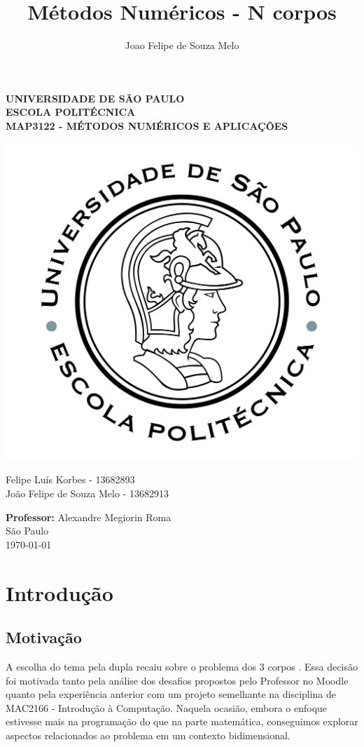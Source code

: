 \documentclass[a4paper, 12pt]{article} %
\title{Métodos Numéricos - N corpos}
\author{Joao  Felipe de Souza Melo}
\begin{document}
\begin{titlepage}
    \centering

    \textbf{\large UNIVERSIDADE DE SÃO PAULO \\
        ESCOLA POLITÉCNICA \\
        MAP3122 - MÉTODOS NUMÉRICOS E APLICAÇÕES}
    \vspace{1.0cm} 
    
    \includegraphics[width=1\textwidth]{poli.jpg}  
    
    \vspace{1cm}  

    Felipe Luís Korbes - 13682893 \\
    João Felipe de Souza Melo - 13682913 \\
    
    \vspace{0.5cm}
    
    \textbf{Professor:} Alexandre Megiorin Roma \\
    
    \vfill 
    São Paulo \\
    \today

\end{titlepage}

\section{Introdução}
\subsection{Motivação}
A escolha do tema pela dupla recaiu sobre o problema dos 3 corpos \cite{n-Body} \cite{astro}. Essa decisão foi motivada tanto pela análise dos desafios propostos pelo Professor no Moodle \cite{moodle} quanto pela  experiência anterior com um projeto semelhante na disciplina de MAC2166 - Introdução à Computação. Naquela ocasião, embora o enfoque estivesse mais na programação do que na parte matemática, conseguimos explorar aspectos relacionados ao problema em um contexto bidimensional.
\end{document}

